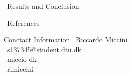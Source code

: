 \documentclass[final]{beamer}
\newlength{\onecolwid}
\begin{document}
\begin{frame}[t]
\begin{columns}[t]
\begin{column}{\onecolwid}
	\begin{block}{\faPieChart \, Results and Conclusion}
		\blindtext
	\end{block}

	\begin{block}{\faPaperclip \, References}
		\nocite{*}
		\small{\printbibliography}
	\end{block}

	\begin{alertblock}{ Conctact Information}
		\faUser \, Riccardo Miccini \\
		\faEnvelope \, s137345@student.dtu.dk \\
		\faGithub \, miccio-dk \\
		\faLinkedin \, rimiccini
	\end{alertblock}

\end{column}

\end{columns}
\end{frame}
\end{document}
